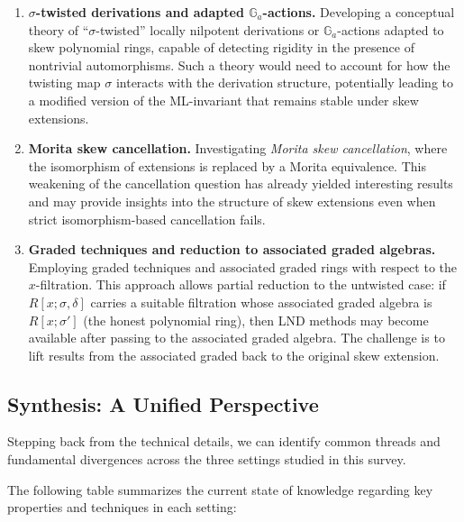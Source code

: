 \documentclass{amsart}
\theoremstyle{plain}
\numberwithin{theorem}{section}
\numberwithin{equation}{theorem}
\theoremstyle{definition}
\begin{document}
\begin{enumerate}
\item \textbf{$\sigma$-twisted derivations and adapted $\mathbb{G}_a$-actions.}
Developing a conceptual theory of ``$\sigma$-twisted'' locally nilpotent derivations or $\mathbb{G}_a$-actions adapted to skew polynomial rings, capable of detecting rigidity in the presence of nontrivial automorphisms. Such a theory would need to account for how the twisting map $\sigma$ interacts with the derivation structure, potentially leading to a modified version of the ML-invariant that remains stable under skew extensions.

\item \textbf{Morita skew cancellation.}
Investigating \emph{Morita skew cancellation}, where the isomorphism of extensions is replaced by a Morita equivalence. This weakening of the cancellation question has already yielded interesting results \cite{ LuWZ,TZZ} and may provide insights into the structure of skew extensions even when strict isomorphism-based cancellation fails.

\item \textbf{Graded techniques and reduction to associated graded algebras.}
Employing graded techniques and associated graded rings with respect to the $x$-filtration. This approach allows partial reduction to the untwisted case: if $R[x;\sigma,\delta]$ carries a suitable filtration whose associated graded algebra is $R[x;\sigma']$ (the honest polynomial ring), then LND methods may become available after passing to the associated graded algebra. The challenge is to lift results from the associated graded back to the original skew extension.
\end{enumerate}

\subsection{Synthesis: A Unified Perspective}

Stepping back from the technical details, we can identify common threads and fundamental divergences across the three settings studied in this survey.



The following table summarizes the current state of knowledge regarding key properties and techniques in each setting:
\end{document}

